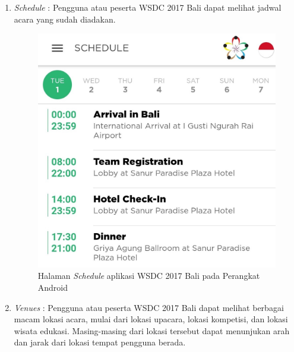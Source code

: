 \begin{enumerate}
	\item {\it Schedule} : Pengguna atau peserta WSDC 2017 Bali dapat melihat jadwal acara yang sudah diadakan.

	\begin{figure}[H]
	    \centering
	    \includegraphics[scale=0.3]{Gambar/Schedule.jpg}
	    \caption{Halaman {\it Schedule} aplikasi WSDC 2017 Bali pada Perangkat Android}
	    \label{fig:wsdcappschedule}
	\end{figure}

	\item {\it Venues} : Pengguna atau peserta WSDC 2017 Bali dapat melihat berbagai macam lokasi acara, mulai dari lokasi upacara, lokasi kompetisi, dan lokasi wisata edukasi. Masing-masing dari lokasi tersebut dapat menunjukan arah dan jarak dari lokasi tempat pengguna berada.


\end{enumerate}
